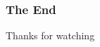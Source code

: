 \begin{comment}
        
\end{columns}
\vspace{0.2cm}

\vfill
}
\end{frame}
    
\end{comment}


\begin{frame} \frametitle{The End} 
\vspace{1cm}
\begin{center}
    {\large Thanks for watching}
\end{center}
\vfill
\end{frame}

\begin{comment}

\subsection{Conclusion}

\begin{frame}[fragile] \frametitle{Conclusion} 
\begin{itemize}
    \item A methodology to \textit{optimize} program protected by \textit{side-effect free} detectors (up to 80\% of \texttt{detectors} removed)
    \item[]
    \item Only one program exploration $\rightarrow$ realistic analysis time for real world programs
    \item[]
    \item The methodology is generic regarding to the analysis level and trace generation method
    
\end{itemize}
\vfill
\end{frame}



\subsection{Conclusion}
\begin{frame} \frametitle{Conclusion} 
{\small


\end{comment}
